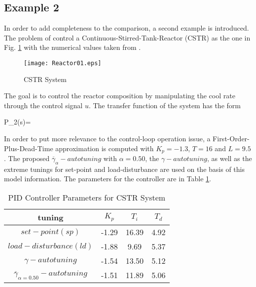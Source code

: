 %
\subsection{Example 2}
%

In order to add completeness to the comparison, a second example
is introduced. The problem of control a
Continuous-Stirred-Tank-Reactor (CSTR) as the one in Fig.
\ref{CSTR} with the numerical values taken from \cite{Huang96}.\\

\begin{figure}[htb!]  \label{fig:cstr}
\centering
\texttt{[image: Reactor01.eps]}
\caption{CSTR System} \label{CSTR}
\end{figure}

The goal is to control the reactor composition by manipulating the
cool rate through the control signal $u$. The transfer function of
the system has the form

\be P_2(s)= \ee

In order to put more relevance to the control-loop operation
issue, a First-Order-Plus-Dead-Time approximation is computed with
$K_p=-1.3$, $T=16$ and $L=9.5$. The proposed
$\overline{\gamma}_{\alpha}-autotuning$ with $\alpha=0.50$, the
$\gamma-autotuning$, as well as the extreme tunings for set-point
and load-disturbance are used on the basis of this model
information. The parameters for the controller are in Table
\ref{PID_parameters2}.

\begin{table}[h!]
\begin{center}
\caption{PID Controller Parameters for CSTR System}
\begin{tabular}{c|ccc}
\hline \textbf{tuning}                        &$K_p$  &$T_i$ &$T_d$\\
\hline
$set-point(sp)$                               &-1.29  &16.39  &4.92 \\
$load-disturbance(ld)$                        &-1.88  & 9.69  &5.37 \\
$\gamma-autotuning$                           &-1.54  &13.50  &5.12 \\
$\overline{\gamma}_{\alpha=0.50}-autotuning$  &-1.51  &11.89  &5.06 \\
\hline
\end{tabular}
\label{PID_parameters2}
\end{center}
\end{table}

